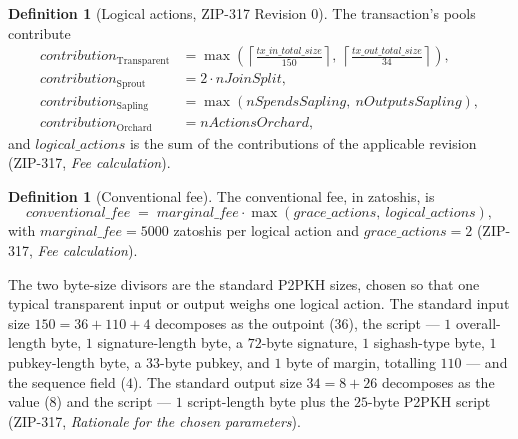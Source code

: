 \documentclass[11pt,a4paper]{article}
\theoremstyle{definition}
\newtheorem{definition}[theorem]{Definition}
\begin{document}
\begin{definition}[Logical actions, ZIP-317 Revision 0]%
\label{def:logical-actions}
The transaction's pools contribute
\begin{align*}
\mathit{contribution}_{\mathrm{Transparent}} &=
  \max\!\left(\left\lceil
    \frac{\mathit{tx\_in\_total\_size}}{150} \right\rceil,\
  \left\lceil \frac{\mathit{tx\_out\_total\_size}}{34} \right\rceil\right),\\
\mathit{contribution}_{\mathrm{Sprout}} &= 2 \cdot \mathit{nJoinSplit},\\
\mathit{contribution}_{\mathrm{Sapling}} &=
  \max(\mathit{nSpendsSapling},\ \mathit{nOutputsSapling}),\\
\mathit{contribution}_{\mathrm{Orchard}} &= \mathit{nActionsOrchard},
\end{align*}
and $\mathit{logical\_actions}$ is the sum of the contributions of the
applicable revision (ZIP-317, \emph{Fee calculation}).
\end{definition}

\begin{definition}[Conventional fee]\label{def:conventional-fee}
The conventional fee, in zatoshis, is
\[
\mathit{conventional\_fee} \;=\; \mathit{marginal\_fee} \cdot
\max(\mathit{grace\_actions},\ \mathit{logical\_actions}),
\]
with $\mathit{marginal\_fee} = 5000$ zatoshis per logical action and
$\mathit{grace\_actions} = 2$ (ZIP-317, \emph{Fee calculation}).
\end{definition}

The two byte-size divisors are the standard P2PKH sizes, chosen so that one
typical transparent input or output weighs one logical action. The standard
input size $150 = 36 + 110 + 4$ decomposes as the outpoint ($36$), the
script --- $1$ overall-length byte, $1$ signature-length byte, a $72$-byte
signature, $1$ sighash-type byte, $1$ pubkey-length byte, a $33$-byte
pubkey, and $1$ byte of margin, totalling $110$ --- and the sequence field
($4$). The standard output size $34 = 8 + 26$ decomposes as the value ($8$)
and the script --- $1$ script-length byte plus the $25$-byte P2PKH script
(ZIP-317, \emph{Rationale for the chosen parameters}).
\end{document}
